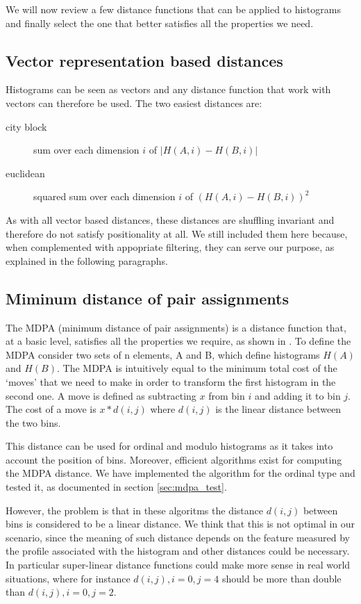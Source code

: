 We will now review a few distance functions that can be applied to histograms and finally select the one that better satisfies all the properties we need.

\subsection{Vector representation based distances}

Histograms can be seen as vectors and any distance function that work with vectors can therefore be used. The two easiest distances are:
\begin{description}
  \item[city block] sum over each dimension $i$ of $|H(A,i) - H(B,i)|$
  \item[euclidean] squared sum over each dimension $i$ of $(H(A,i) - H(B,i))^2$
\end{description}

As with all vector based distances, these distances are shuffling invariant and therefore do not satisfy positionality at all. We still included them here because, when complemented with appopriate filtering, they can serve our purpose, as explained in the following paragraphs.

\subsection{Miminum distance of pair assignments}

The MDPA (minimum distance of pair assignments) is a distance function that, at a basic level, satisfies all the properties we require, as shown in \cite{histogram}. To define the MDPA consider two sets of n elements, A and B, which define histograms $H(A)$ and $H(B)$. The MDPA is intuitively equal to the minimum total cost of the `moves' that we need to make in order to transform the first histogram in the second one. A move is defined as subtracting $x$ from bin $i$ and adding it to bin $j$. The cost of a move is $x * d(i, j)$ where $d(i, j)$ is the linear distance between the two bins.

This distance can be used for ordinal and modulo histograms as it takes into account the position of bins. Moreover, efficient algorithms exist for computing the MDPA distance. We have implemented the algorithm for the ordinal type and tested it, as documented in section \ref{sec:mdpa_test}.

However, the problem is that in these algoritms the distance $d(i, j)$ between bins is considered to be a linear distance. We think that this is not optimal in our scenario, since the meaning of such distance depends on the feature measured by the profile associated with the histogram and other distances could be necessary. In particular super-linear distance functions could make more sense in real world situations, where for instance $d(i, j), i=0, j=4$ should be more than double than $d(i, j), i=0, j=2$.

